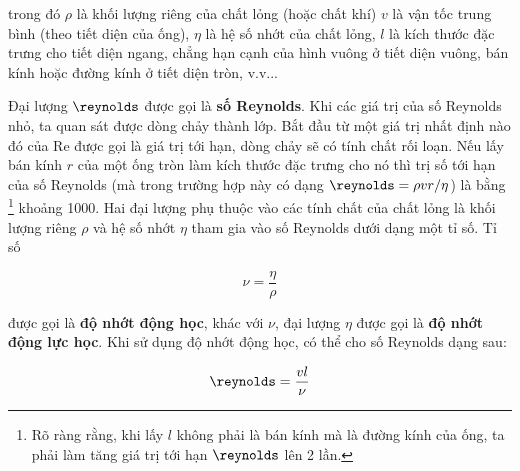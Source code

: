 trong đó $\rho$ là khối lượng riêng của chất lỏng (hoặc chất khí) $v$ là vận tốc trung bình (theo tiết diện của ống), $\eta$ là hệ số nhớt của chất lỏng, $l$ là kích thước đặc trưng cho tiết diện ngang, chẳng hạn cạnh của hình vuông ở tiết diện vuông, bán kính hoặc đường kính ở tiết diện tròn, v.v...


Đại lượng $\reynolds$ được gọi là \textbf{số Reynolds}. Khi các giá trị của số Reynolds nhỏ, ta quan sát được dòng chảy thành lớp. Bắt đầu từ một giá trị nhất định nào đó của Re được gọi là giá trị tới hạn, dòng chảy sẽ có tính chất rối loạn. Nếu lấy bán kính $r$ của một ống tròn làm kích thước đặc trưng cho nó thì trị số tới hạn của số Reynolds (mà trong trường hợp này có dạng $\reynolds=\rho vr/\eta$) là bằng \footnote{Rõ ràng rằng, khi lấy $l$ không phải là bán kính mà là đường kính của ống, ta phải làm tăng giá trị tới hạn $\reynolds$ lên 2 lần.} khoảng \num{1000}. Hai đại lượng phụ thuộc vào các tính chất của chất lỏng là khối lượng riêng $\rho$ và hệ số nhớt $\eta$ tham gia vào số Reynolds dưới dạng một tỉ số. Tỉ số

\begin{equation}\label{eq:9_14}
	\nu = \frac{\eta}{\rho}
\end{equation}
\noindent


được gọi là \textbf{độ nhớt động học}, khác với $\nu$, đại lượng $\eta$ được gọi là \textbf{độ nhớt động lực học}. Khi sử dụng độ nhớt động học, có thể cho số Reynolds dạng sau:

\begin{equation}\label{eq:9_15}
	\reynolds = \frac{vl}{\nu}
\end{equation}
\noindent

